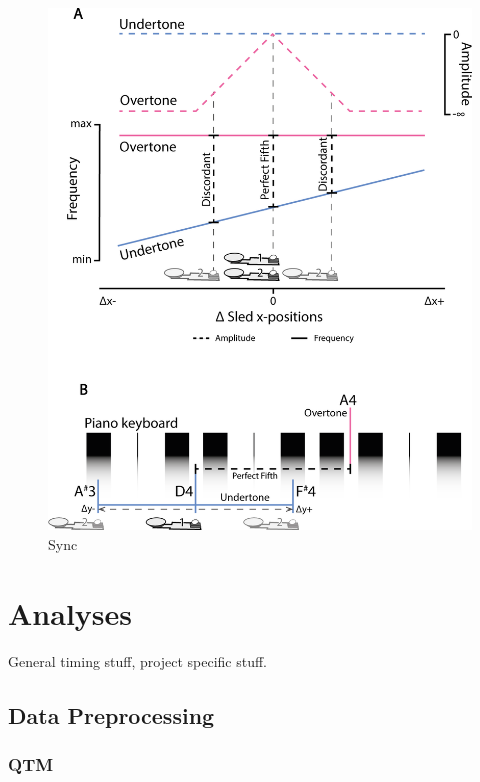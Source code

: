 \documentclass[10pt,a4paper,onecolumn]{article}
\begin{document}
\begin{figure}

{\centering \includegraphics[width=1\linewidth]{figures/sync_sonif_illustration} 

}

\caption{Sync}\label{fig:sync-illustration}
\end{figure}

\hypertarget{analyses}{%
\section{Analyses}\label{analyses}}

General timing stuff, project specific stuff.

\hypertarget{data-preprocessing}{%
\subsection{Data Preprocessing}\label{data-preprocessing}}

\hypertarget{qtm}{%
\subsubsection{QTM}\label{qtm}}
\end{document}
